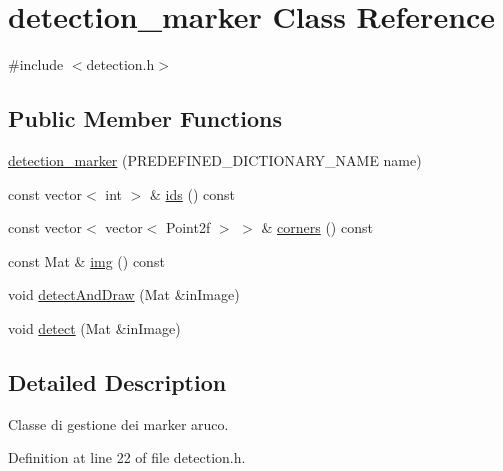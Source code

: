 \hypertarget{classdetection__marker}{\section{detection\+\_\+marker Class Reference}
\label{classdetection__marker}
}


{\ttfamily \#include $<$detection.\+h$>$}

\subsection*{Public Member Functions}
\begin{DoxyCompactItemize}
\item 
\hyperlink{classdetection__marker_a78703d9cfece4550684a3f6e0dfd659b}{detection\+\_\+marker} (P\+R\+E\+D\+E\+F\+I\+N\+E\+D\+\_\+\+D\+I\+C\+T\+I\+O\+N\+A\+R\+Y\+\_\+\+N\+A\+M\+E name)
\item 
const vector$<$ int $>$ \& \hyperlink{classdetection__marker_a486d89e7f7008d87a1c3c26c89ad3b74}{ids} () const 
\item 
const vector$<$ vector$<$ Point2f $>$ $>$ \& \hyperlink{classdetection__marker_a243c4a54a4b9d9c084672660e5d47f39}{corners} () const 
\item 
const Mat \& \hyperlink{classdetection__marker_a770b0b3075bf960621006f7f939b9757}{img} () const 
\item 
void \hyperlink{classdetection__marker_a08cd89907df009bce97bb5a6561074e6}{detect\+And\+Draw} (Mat \&in\+Image)
\item 
void \hyperlink{classdetection__marker_a4149fb9467f5cc15b1086c548821d925}{detect} (Mat \&in\+Image)
\end{DoxyCompactItemize}


\subsection{Detailed Description}
Classe di gestione dei marker aruco. 

Definition at line 22 of file detection.\+h.



